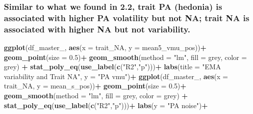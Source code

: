 \documentclass[
]{article}
\newenvironment{Shaded}{\begin{snugshade}}{\end{snugshade}}
\newcommand{\AttributeTok}[1]{\textcolor[rgb]{0.13,0.29,0.53}{#1}}
\newcommand{\FloatTok}[1]{\textcolor[rgb]{0.00,0.00,0.81}{#1}}
\newcommand{\FunctionTok}[1]{\textcolor[rgb]{0.13,0.29,0.53}{\textbf{#1}}}
\newcommand{\NormalTok}[1]{#1}
\newcommand{\SpecialCharTok}[1]{\textcolor[rgb]{0.81,0.36,0.00}{\textbf{#1}}}
\newcommand{\StringTok}[1]{\textcolor[rgb]{0.31,0.60,0.02}{#1}}
\begin{document}
\hypertarget{similar-to-what-we-found-in-2.2-trait-pa-hedonia-is-associated-with-higher-pa-volatility-but-not-na-trait-na-is-associated-with-higher-na-but-not-variability.}{%
\subsubsection{Similar to what we found in 2.2, trait PA (hedonia) is
associated with higher PA volatility but not NA; trait NA is associated
with higher NA but not
variability.}\label{similar-to-what-we-found-in-2.2-trait-pa-hedonia-is-associated-with-higher-pa-volatility-but-not-na-trait-na-is-associated-with-higher-na-but-not-variability.}}

\begin{Shaded}
\begin{Highlighting}[]
\FunctionTok{ggplot}\NormalTok{(df\_master\_, }\FunctionTok{aes}\NormalTok{(}\AttributeTok{x =}\NormalTok{ trait\_NA, }\AttributeTok{y =}\NormalTok{ mean5\_vmu\_pos))}\SpecialCharTok{+}
  \FunctionTok{geom\_point}\NormalTok{(}\AttributeTok{size =} \FloatTok{0.5}\NormalTok{)}\SpecialCharTok{+}
  \FunctionTok{geom\_smooth}\NormalTok{(}\AttributeTok{method =} \StringTok{"lm"}\NormalTok{, }\AttributeTok{fill =} \StringTok{\textquotesingle{}grey\textquotesingle{}}\NormalTok{, }\AttributeTok{color =} \StringTok{\textquotesingle{}grey\textquotesingle{}}\NormalTok{) }\SpecialCharTok{+}
  \FunctionTok{stat\_poly\_eq}\NormalTok{(}\FunctionTok{use\_label}\NormalTok{(}\FunctionTok{c}\NormalTok{(}\StringTok{"R2"}\NormalTok{,}\StringTok{"p"}\NormalTok{)))}\SpecialCharTok{+}
  \FunctionTok{labs}\NormalTok{(}\AttributeTok{title =} \StringTok{"EMA variability and Trait NA"}\NormalTok{,}
       \AttributeTok{y =} \StringTok{"PA vmu"}\NormalTok{)}\SpecialCharTok{+}
\FunctionTok{ggplot}\NormalTok{(df\_master\_, }\FunctionTok{aes}\NormalTok{(}\AttributeTok{x =}\NormalTok{ trait\_NA, }\AttributeTok{y =}\NormalTok{ mean\_s\_pos))}\SpecialCharTok{+}
  \FunctionTok{geom\_point}\NormalTok{(}\AttributeTok{size =} \FloatTok{0.5}\NormalTok{)}\SpecialCharTok{+}
  \FunctionTok{geom\_smooth}\NormalTok{(}\AttributeTok{method =} \StringTok{"lm"}\NormalTok{, }\AttributeTok{fill =} \StringTok{\textquotesingle{}grey\textquotesingle{}}\NormalTok{, }\AttributeTok{color =} \StringTok{\textquotesingle{}grey\textquotesingle{}}\NormalTok{) }\SpecialCharTok{+}
  \FunctionTok{stat\_poly\_eq}\NormalTok{(}\FunctionTok{use\_label}\NormalTok{(}\FunctionTok{c}\NormalTok{(}\StringTok{"R2"}\NormalTok{,}\StringTok{"p"}\NormalTok{)))}\SpecialCharTok{+}
  \FunctionTok{labs}\NormalTok{(}\AttributeTok{y =} \StringTok{"PA noise"}\NormalTok{)}\SpecialCharTok{+}

\end{Highlighting}
\end{Shaded}
\end{document}
